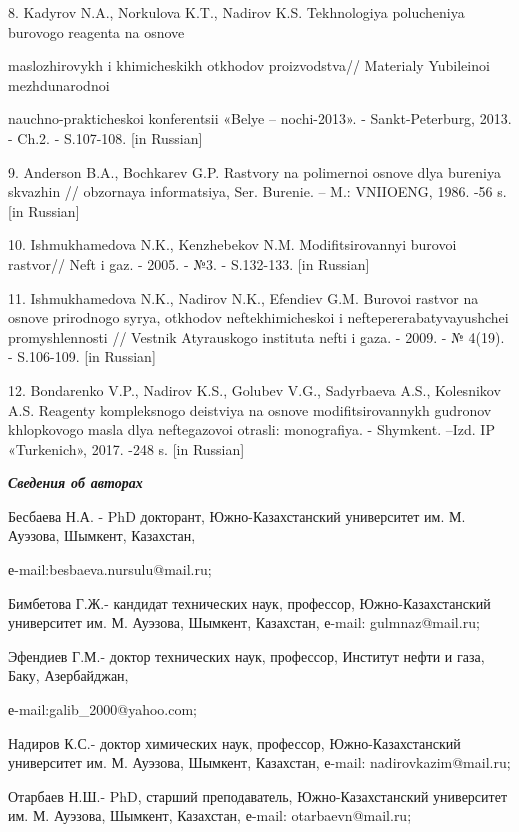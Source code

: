 \begin{noparindent}
8. Kadyrov N.A., Norkulova K.T., Nadirov K.S. Tekhnologiya polucheniya
burovogo reagenta na osnove

maslozhirovykh i khimicheskikh otkhodov
proizvodstva// Materialy Yubileinoi mezhdunarodnoi

nauchno-prakticheskoi
konferentsii «Belye -- nochi-2013». - Sankt-Peterburg, 2013. - Ch.2. -
S.107-108. {[}in Russian{]}

9. Anderson B.A., Bochkarev G.P. Rastvory na polimernoi osnove dlya
bureniya skvazhin // obzornaya informatsiya, Ser. Burenie. -- M.:
VNIIOENG, 1986. -56 s. {[}in Russian{]}

10. Ishmukhamedova N.K., Kenzhebekov N.M. Modifitsirovannyi burovoi
rastvor// Neft\textquotesingle{} i gaz. - 2005. - №3. - S.132-133. {[}in
Russian{]}

11. Ishmukhamedova N.K., Nadirov N.K., Efendiev G.M. Burovoi rastvor na
osnove prirodnogo syr\textquotesingle ya, otkhodov neftekhimicheskoi i
neftepererabatyvayushchei promyshlennosti // Vestnik Atyrauskogo
instituta nefti i gaza. - 2009. - № 4(19). - S.106-109. {[}in Russian{]}

12. Bondarenko V.P., Nadirov K.S., Golubev V.G., Sadyrbaeva A.S.,
Kolesnikov A.S. Reagenty kompleksnogo deistviya na osnove
modifitsirovannykh gudronov khlopkovogo masla dlya neftegazovoi otrasli:
monografiya. - Shymkent. --Izd. IP «Turkenich», 2017. -248 s. {[}in
Russian{]}
\end{noparindent}

\emph{{\bfseries Сведения об авторах}}

\begin{noparindent}
Бесбаева Н.А. - PhD докторант, Южно-Казахстанский университет им. М.
Ауэзова, Шымкент, Казахстан,

е-mail:besbaeva.nursulu@mail.ru;

Бимбетова Г.Ж.- кандидат технических наук, профессор, Южно-Казахстанский
университет им. М. Ауэзова, Шымкент, Казахстан, е-mail: gulmnaz@mail.ru;

Эфендиев Г.М.- доктор технических наук, профессор, Институт нефти и
газа, Баку, Азербайджан,

е-mail:galib\_2000@yahoo.com;

Надиров К.С.- доктор химических наук, профессор, Южно-Казахстанский
университет им. М. Ауэзова, Шымкент, Казахстан, е-mail:
nadirovkazim@mail.ru;

Отарбаев Н.Ш.- PhD, старший преподаватель, Южно-Казахстанский
университет им. М. Ауэзова, Шымкент, Казахстан, е-mail:
otarbaevn@mail.ru;
\end{noparindent}

